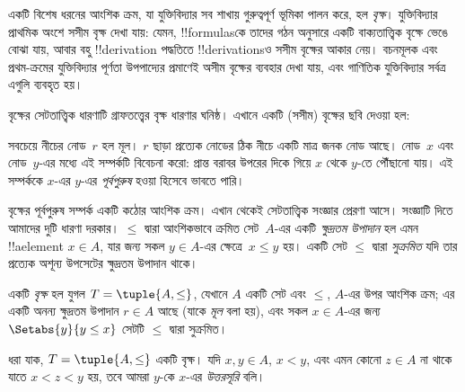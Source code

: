 \documentclass[../../../include/open-logic-section]{subfiles}
\begin{document}

একটি বিশেষ ধরনের আংশিক ক্রম, যা যুক্তিবিদ্যার সব শাখায় গুরুত্বপূর্ণ ভূমিকা পালন করে, হল \emph{বৃক্ষ}। যুক্তিবিদ্যার প্রাথমিক অংশে সসীম বৃক্ষ দেখা যায়: যেমন, !!{formula}sকে তাদের গঠন অনুসারে একটি বাক্যতাত্ত্বিক বৃক্ষে ভেঙে বোঝা যায়, আবার বহু !!{derivation} পদ্ধতিতে !!{derivation}sও সসীম বৃক্ষের আকার নেয়।
%
বচনমূলক এবং প্রথম-ক্রমের যুক্তিবিদ্যার পূর্ণতা উপপাদ্যের প্রমাণেই অসীম বৃক্ষের ব্যবহার দেখা যায়, এবং গাণিতিক যুক্তিবিদ্যার সর্বত্র এগুলি ব্যবহৃত হয়।

বৃক্ষের সেটতাত্ত্বিক ধারণাটি গ্রাফতত্ত্বের বৃক্ষ ধারণার ঘনিষ্ঠ। এখানে একটি (সসীম) বৃক্ষের ছবি দেওয়া হল:

\begin{center}
\end{center}

সবচেয়ে নীচের নোড~$r$ হল মূল। $r$ ছাড়া প্রত্যেক নোডের ঠিক নীচে একটি মাত্র জনক নোড আছে। নোড~$x$ এবং নোড~$y$-এর মধ্যে এই সম্পর্কটি বিবেচনা করো: প্রান্ত বরাবর উপরের দিকে গিয়ে $x$ থেকে $y$-তে পৌঁছানো যায়। এই সম্পর্ককে $x$-এর $y$-এর \emph{পূর্বপুরুষ} হওয়া হিসেবে ভাবতে পারি।

বৃক্ষের পূর্বপুরুষ সম্পর্ক একটি কঠোর আংশিক ক্রম। এখান থেকেই সেটতাত্ত্বিক সংজ্ঞার প্রেরণা আসে। সংজ্ঞাটি দিতে আমাদের দুটি ধারণা দরকার। $\le$ দ্বারা আংশিকভাবে ক্রমিত সেট~$A$-এর একটি \emph{ক্ষুদ্রতম উপাদান} হল এমন !!a{element} $x \in A$, যার জন্য সকল $y \in A$-এর ক্ষেত্রে~$x \le y$ হয়। একটি সেট $\le$ দ্বারা \emph{সুক্রমিত} যদি তার প্রত্যেক অশূন্য উপসেটের ক্ষুদ্রতম উপাদান থাকে।

\begin{defn}[বৃক্ষ]
একটি \emph{বৃক্ষ} হল যুগল $T = \tuple{A, \le}$, যেখানে $A$ একটি সেট এবং $\le$, $A$-এর উপর আংশিক ক্রম; এর একটি অনন্য ক্ষুদ্রতম উপাদান $r \in A$ আছে (যাকে \emph{মূল} বলা হয়), এবং সকল $x \in A$-এর জন্য $\Setabs{y}{y \le x}$ সেটটি $\le$ দ্বারা সুক্রমিত।
\end{defn}

\begin{defn}[উত্তরসূরি]
ধরা যাক, $T = \tuple{A, \le}$ একটি বৃক্ষ। যদি $x,y \in A$, $x < y$, এবং এমন কোনো $z \in A$ না থাকে যাতে $x < z < y$ হয়, তবে আমরা $y$-কে $x$-এর \emph{উত্তরসূরি} বলি।
\end{defn}
\end{document}
